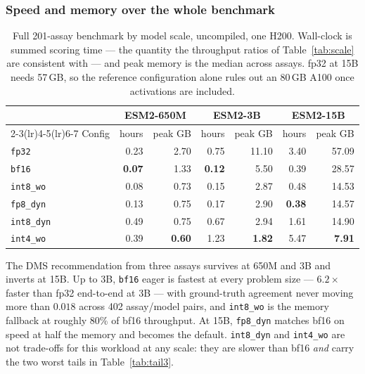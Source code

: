 \documentclass[11pt]{article}
\newcommand{\cfg}[1]{\texttt{#1}}
\begin{document}
\subsubsection{Speed and memory over the whole benchmark}

\begin{table}[htb]
\centering
\caption{Full 201-assay benchmark by model scale, uncompiled, one H200.
Wall-clock is summed scoring time --- the quantity the throughput ratios of
Table~\ref{tab:scale} are consistent with --- and peak memory is the median
across assays.
fp32 at 15B needs 57\,GB, so the reference configuration alone rules out an
80\,GB A100 once activations are included.}
\label{tab:speedram3}
\small
\begin{tabular}{lrrrrrr}
\toprule
& \multicolumn{2}{c}{ESM2-650M} & \multicolumn{2}{c}{ESM2-3B} & \multicolumn{2}{c}{ESM2-15B} \\
\cmidrule(lr){2-3}\cmidrule(lr){4-5}\cmidrule(lr){6-7}
Config & hours & peak GB & hours & peak GB & hours & peak GB \\
\midrule
\cfg{fp32}      & 0.23 &  2.70 & 0.75 & 11.10 & 3.40 & 57.09 \\
\cfg{bf16}      & \textbf{0.07} &  1.33 & \textbf{0.12} &  5.50 & 0.39 & 28.57 \\
\cfg{int8\_wo}  & 0.08 &  0.73 & 0.15 &  2.87 & 0.48 & 14.53 \\
\cfg{fp8\_dyn}  & 0.13 &  0.75 & 0.17 &  2.90 & \textbf{0.38} & 14.57 \\
\cfg{int8\_dyn} & 0.49 &  0.75 & 0.67 &  2.94 & 1.61 & 14.90 \\
\cfg{int4\_wo}  & 0.39 &  \textbf{0.60} & 1.23 &  \textbf{1.82} & 5.47 &  \textbf{7.91} \\
\bottomrule
\end{tabular}
\end{table}

The DMS recommendation from three assays survives at 650M and 3B and inverts at
15B. Up to 3B, \cfg{bf16} eager is fastest at every problem size --- $6.2\times$
faster than fp32 end-to-end at 3B --- with ground-truth agreement never moving
more than $0.018$ across 402 assay/model pairs, and \cfg{int8\_wo} is the memory
fallback at roughly 80\% of bf16 throughput. At 15B, \cfg{fp8\_dyn} matches bf16 on
speed at half the memory and becomes the default. \cfg{int8\_dyn} and
\cfg{int4\_wo} are not trade-offs for this workload at any scale: they are
slower than bf16 \emph{and} carry the two worst tails in Table~\ref{tab:tail3}.
\end{document}
